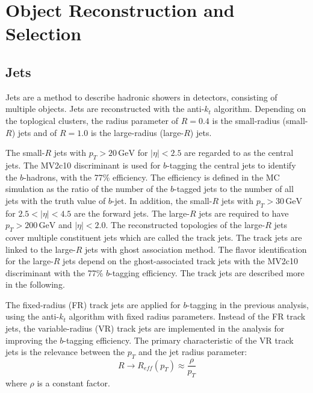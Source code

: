 \documentclass[class=NTHU_thesis, crop=false]{standalone}
\begin{document}
\section{Object Reconstruction and Selection}
\subsection{Jets}
Jets are a method to describe hadronic showers in detectors, consisting of multiple objects. Jets are reconstructed with the anti-$k_t$ algorithm\cite{1126-6708-2008-04-063}. Depending on the toplogical clusters, the radius parameter of $R = 0.4$ is the small-radius (small-$R$) jets and of $R = 1.0$ is the large-radius (large-$R$) jets.

The small-$R$ jets with $p_T > 20\, \mathrm{GeV}$ for $\left|\eta\right| < 2.5$ are regarded to as the central jets. The MV2c10 discriminant\cite{ATL-PHYS-PUB-2015-022} is used for $b$-tagging the central jets to identify the $b$-hadrons, with the 77\% efficiency. The efficiency is defined in the MC simulation as the ratio of the number of the $b$-tagged jets to the number of all jets with the truth value of $b$-jet. In addition, the small-$R$ jets with $p_T > 30\, \mathrm{GeV}$ for $2.5 < \left|\eta\right| < 4.5$ are the forward jets. The large-$R$ jets are required to have $p_T > 200\, \mathrm{GeV}$ and $\left|\eta\right| < 2.0$. The reconstructed topologies of the large-$R$ jets cover multiple constituent jets which are called the track jets. The track jets are linked to the large-$R$ jets with ghost association method\cite{1126-6708-2008-04-005}\cite{CACCIARI2008119}. The flavor identification for the large-$R$ jets depend on the ghost-associated track jets with the MV2c10 discriminant with the 77\% $b$-tagging efficiency. The track jets are described more in the following.

The fixed-radius (FR) track jets are applied for $b$-tagging in the previous analysis, using the anti-$k_t$ algorithm with fixed radius parameters. Instead of the FR track jets, the variable-radius (VR) track jets\cite{0903.0392} are implemented in the analysis for improving the $b$-tagging efficiency. The primary characteristic of the VR track jets is the relevance between the $p_T$ and the jet radius parameter: 
\begin{equation}
R \to R_{eff}(p_T) \approx \frac{\rho}{p_T}
\end{equation}
where $\rho$ is a constant factor.
\end{document}
